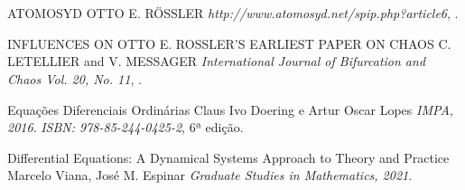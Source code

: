 \documentclass[12pt,a4paper]{article} %
\theoremstyle{definition}
\numberwithin{equation}{ex}
\theoremstyle{definition}
\begin{document}
\section{} 
	\begin{thebibliography}{3}
		\bibitem{}
		ATOMOSYD
		\newblock OTTO E. RÖSSLER
		\newblock\emph{http://www.atomosyd.net/spip.php?article6},
		.
		
		INFLUENCES ON OTTO E. ROSSLER’S EARLIEST PAPER ON CHAOS
		\newblock C. LETELLIER and V. MESSAGER
		\newblock\emph{International Journal of Bifurcation and Chaos Vol. 20, No. 11},
		.
		
		Equações Diferenciais Ordinárias
		\newblock Claus Ivo Doering e Artur Oscar Lopes
		\newblock \emph{IMPA, 2016}.
		\newblock \emph{ISBN: 978-85-244-0425-2}, 6ª edição.
		
		Differential Equations: A Dynamical Systems Approach to Theory and Practice
		\newblock Marcelo Viana, José M. Espinar
		\newblock \emph{Graduate Studies in Mathematics, 2021}.
	\end{thebibliography}
\end{document}
